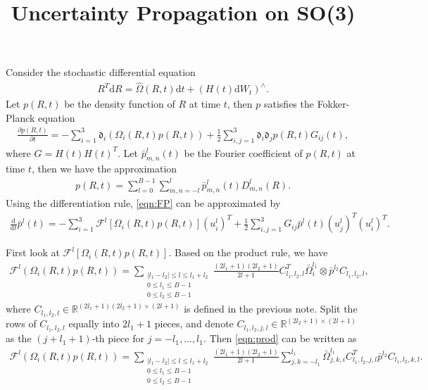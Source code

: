 \documentclass[12pt]{article}
\title{\vspace{-4ex}\textbf{Uncertainty Propagation on SO(3)\vspace{-4ex}}}
\date{}
\newcommand{\abs}[1]{\ensuremath{\left| #1 \right|}}
\newcommand{\diff}[1]{\mathrm{d}#1}
\newcommand{\liediff}{\mathfrak{d}}
\newcommand{\dft}{\mathcal{F}}
\newcommand{\real}{\ensuremath{\mathbb{R}}}
\begin{document}
\maketitle

Consider the stochastic differential equation
\begin{align*}
	R^T\diff{R} = \hat{\Omega}(R,t)\diff{t} + (H(t)\diff{W_t})^\wedge.
\end{align*}
Let $p(R,t)$ be the density function of $R$ at time $t$, then $p$ satisfies the Fokker-Planck equation
\begin{align}
	\frac{\partial p(R,t)}{\partial t} = -\sum_{i=1}^3 \liediff_i(\Omega_i(R,t)p(R,t)) + \frac{1}{2} \sum_{i,j=1}^3 \liediff_i\liediff_jp(R,t) G_{ij}(t), \label{eqn:FP}
\end{align}
where $G = H(t)H(t)^T$.
Let $\bar{p}_{m,n}^l(t)$ be the Fourier coefficient of $p(R,t)$ at time $t$, then we have the approximation
\begin{align*}
	p(R,t) = \sum_{l=0}^{B-1} \sum_{m,n=-l}^l \bar{p}_{m,n}^l(t) D_{m,n}^l(R).
\end{align*}
Using the differentiation rule, \eqref{eqn:FP} can be approximated by
\begin{align*}
	\frac{\diff{}}{\diff{t}} \bar{p}^l(t) = -\sum_{i=1}^3 \dft^l[\Omega_i(R,t)p(R,t)] (u_i^l)^T + \frac{1}{2}\sum_{i,j=1}^3 G_{ij} \bar{p}^l(t) (u_j^l)^T(u_i^l)^T.
\end{align*}

First look at $\mathcal{F}^l[\Omega_i(R,t)p(R,t)]$.
Based on the product rule, we have
\begin{align}
	\mathcal{F}^l(\Omega_i(R,t)p(R,t)) = \sum_{\substack{\abs{l_1-l_2} \leq l \leq l_1+l_2 \\ 0 \leq l_1 \leq B-1 \\ 0 \leq l_2 \leq B-1}} \frac{(2l_1+1)(2l_2+1)}{2l+1} C_{l_1,l_2,l}^T \bar{\Omega}_i^{l_1} \otimes \bar{p}^{l_2} C_{l_1,l_2,l}, \label{eqn:prod}
\end{align}
where $C_{l_1,l_2,l}\in\real^{(2l_1+1)(2l_2+1) \times (2l+1)}$ is defined in the previous note.
Split the rows of $C_{l_1,l_2,l}$ equally into $2l_1+1$ pieces, and denote $C_{l_1,l_2,j,l} \in \real^{(2l_2+1) \times (2l+1)}$ as the $(j+l_1+1)$-th piece for $j=-l_1,\ldots,l_1$.
Then \eqref{eqn:prod} can be written as
\begin{align} \label{eqn:l,l2}
	\mathcal{F}^l(\Omega_i(R,t)p(R,t)) = \sum_{\substack{\abs{l_1-l_2} \leq l \leq l_1+l_2 \\ 0 \leq l_1 \leq B-1 \\ 0 \leq l_2 \leq B-1}} \frac{(2l_1+1)(2l_2+1)}{2l+1} \sum_{j,k=-l_1}^{l_1} \bar{\Omega}_{j,k,i}^{l_1} C_{l_1,l_2,j,l}^T \bar{p}^{l_2} C_{l_1,l_2,k,l}.
\end{align}
\end{document}
